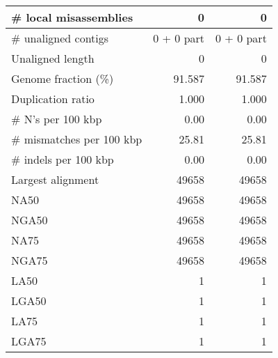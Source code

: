 \documentclass[12pt,a4paper]{article}
\begin{document}
\begin{table}[ht]
\begin{center}
\begin{tabular}{|l*{2}{|r}|}
\# local misassemblies & 0 & 0 \\ \hline
\# unaligned contigs & 0 + 0 part & 0 + 0 part \\ \hline
Unaligned length & 0 & 0 \\ \hline
Genome fraction (\%) & 91.587 & 91.587 \\ \hline
Duplication ratio & 1.000 & 1.000 \\ \hline
\# N's per 100 kbp & 0.00 & 0.00 \\ \hline
\# mismatches per 100 kbp & 25.81 & 25.81 \\ \hline
\# indels per 100 kbp & 0.00 & 0.00 \\ \hline
Largest alignment & 49658 & 49658 \\ \hline
NA50 & 49658 & 49658 \\ \hline
NGA50 & 49658 & 49658 \\ \hline
NA75 & 49658 & 49658 \\ \hline
NGA75 & 49658 & 49658 \\ \hline
LA50 & 1 & 1 \\ \hline
LGA50 & 1 & 1 \\ \hline
LA75 & 1 & 1 \\ \hline
LGA75 & 1 & 1 \\ \hline
\end{tabular}
\end{center}
\end{table}
\end{document}

